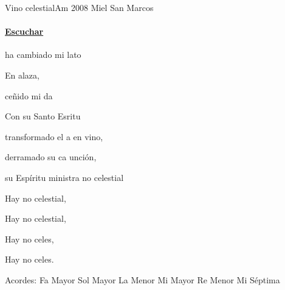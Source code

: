 \documentclass[12pt, spanish]{book}
\newcommand{\NotCCLIed}{\relax}
\begin{document}
    \begin{song}{Vino celestial}{Am}
    {2008} %
    {Miel San Marcos}
    {} %
    {} %
        \ifChordBk
            \paragraph{\mbox{}\hfill\protect\href{https://open.spotify.com/intl-es/track/4uscBcDe06nHSggg9a546a}{Escuchar}\mbox{}\hfill}
        \fi


        \begin{SBOpGroup}
              ha cambiado mi lato

            En alaza,

             ceñido mi da

            Con su Santo Esritu
        \end{SBOpGroup}
        \vskip 20pt
        \begin{SBOpGroup}
             transformado el a en vino,

             derramado su ca unción,

             su Espíritu ministra no celestial
        \end{SBOpGroup}

        \begin{SBChorus}
            Hay no celestial,

            Hay no celestial,

            Hay no celes,

            Hay no celes.
        \end{SBChorus}

        \ifChordBk
        \begin{SBOpGroup}
            Acordes:\break
            \upchord{\F}\qquad Fa Mayor \hfill
            \upchord{\G}\qquad Sol Mayor \hfill\null\break
            \upchord{\Am}\qquad La Menor \hfill
            \upchord{\E}\qquad Mi Mayor \hfill\null\break
            \upchord{\Dm}\qquad Re Menor \hfill
            \upchord{\Eseven}\qquad Mi S\'eptima \hfill\null\break
        \end{SBOpGroup}
        \fi
    \end{song}
\end{document}
